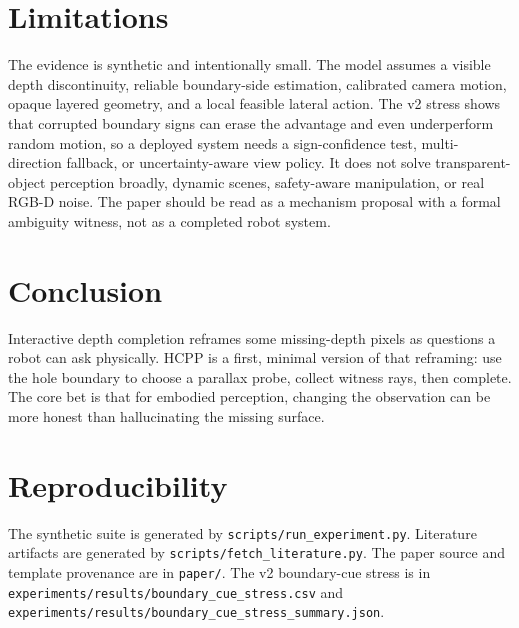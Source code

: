 \documentclass{article}
\begin{document}
\begin{table}[t]
\centering
\caption{V2 boundary-cue stress at 10 cm motion budget and 0.15 clutter. $\Delta$ vs random is positive when corrupted HCPP is worse than the v1 random-motion baseline.}
\label{tab:boundary-stress}

\end{table}

\section{Limitations}
The evidence is synthetic and intentionally small. The model assumes a visible depth discontinuity, reliable boundary-side estimation, calibrated camera motion, opaque layered geometry, and a local feasible lateral action. The v2 stress shows that corrupted boundary signs can erase the advantage and even underperform random motion, so a deployed system needs a sign-confidence test, multi-direction fallback, or uncertainty-aware view policy. It does not solve transparent-object perception broadly, dynamic scenes, safety-aware manipulation, or real RGB-D noise. The paper should be read as a mechanism proposal with a formal ambiguity witness, not as a completed robot system.

\section{Conclusion}
Interactive depth completion reframes some missing-depth pixels as questions a robot can ask physically. HCPP is a first, minimal version of that reframing: use the hole boundary to choose a parallax probe, collect witness rays, then complete. The core bet is that for embodied perception, changing the observation can be more honest than hallucinating the missing surface.




\appendix
\section{Reproducibility}
The synthetic suite is generated by \texttt{scripts/run\_experiment.py}. Literature artifacts are generated by \texttt{scripts/fetch\_literature.py}. The paper source and template provenance are in \texttt{paper/}.
The v2 boundary-cue stress is in \texttt{experiments/results/boundary\_cue\_stress.csv} and \texttt{experiments/results/boundary\_cue\_stress\_summary.json}.
\end{document}
